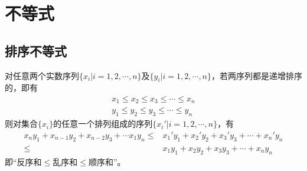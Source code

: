 
\chapter{不等式}
\label{chap:inequality}

\section{排序不等式}
\label{sec:rearrangement-inequality}

\begin{theorem}
  对任意两个实数序列$\{x_i|i=1,2,\cdots,n\}$及$\{y_i|i=1,2,\cdots,n\}$，若两序列都是递增排序的，即有
  \begin{align*}
    x_1\le x_2 \le x_3 \le \cdots \le x_n\\
    y_1\le y_2 \le y_3 \le \cdots \le y_n
  \end{align*}
  则对集合$\{x_i\}$的任意一个排列组成的序列$\{x_i'|i=1,2,\cdots,n\}$，有
  \begin{align*}
    x_ny_1 + x_{n-1}y_2 + x_{n-2}y_3 + \cdots x_1y_n 
    \le&
         x_1'y_1 + x_2'y_2 + x_3'y_3 + \cdots + x_n'y_n \\
    \le&
    x_1y_1 + x_2y_2 + x_3y_3 + \cdots + x_ny_n
  \end{align*}
  即“$\text{反序和}\le \text{乱序和} \le \text{顺序和}$”。
\end{theorem}
